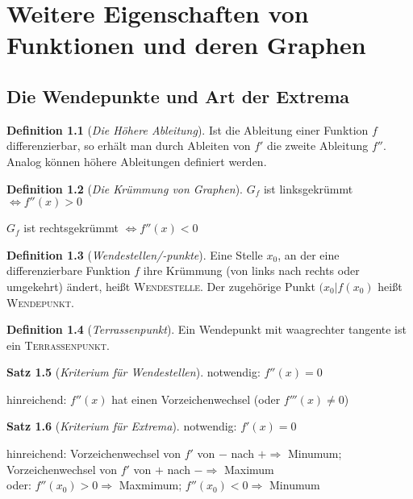 \documentclass[a4paper,12pt,pointlessnumbers]{scrreprt}
\theoremstyle{definition}
\newtheorem{definition}{Definition}[section]
\newtheorem{Satz}[definition]{Satz}
\begin{document}
\chapter{Weitere Eigenschaften von Funktionen und deren Graphen}



\section{Die Wendepunkte und Art der Extrema}
\begin{definition}[\emph{Die Höhere Ableitung}]
Ist die Ableitung einer Funktion $f$ differenzierbar, so erhält man durch Ableiten von $f'$ die zweite Ableitung $f''$. Analog können höhere Ableitungen definiert werden.
\end{definition}
\begin{definition}[\emph{Die Krümmung von Graphen}]
\item $G_f$ ist linksgekrümmt $\Leftrightarrow f''(x)>0$
\item $G_f$ ist rechtsgekrümmt $\Leftrightarrow f''(x)<0$
\end{definition}

\begin{definition}[\emph{Wendestellen/-punkte}]
Eine Stelle $x_0$, an der eine differenzierbare Funktion $f$ ihre Krümmung (von links nach rechts oder umgekehrt) ändert, heißt \textsc{Wendestelle}. Der zugehörige Punkt $(x_0|f(x_0)$ heißt \textsc{Wendepunkt}.
\end{definition}

\begin{definition}[\emph{Terrassenpunkt}]
Ein Wendepunkt mit waagrechter tangente ist ein \textsc{Terrassenpunkt}.
\end{definition}

\begin{Satz}[\emph{Kriterium für Wendestellen}]
\item notwendig: $f''(x)=0$
\item hinreichend: $f''(x)$ hat einen Vorzeichenwechsel (oder $f'''(x)\neq 0$)
\end{Satz}

\begin{Satz}[\emph{Kriterium für Extrema}]
\item notwendig: $f'(x)=0$
\item hinreichend: Vorzeichenwechsel von $f'$ von $-$ nach $+ \Rightarrow$ Minumum; Vorzeichenwechsel von $f'$ von $+$ nach $- \Rightarrow$ Maximum
\\ oder: $f''(x_0)>0 \Rightarrow$ Maxmimum; $f''(x_0)<0 \Rightarrow$ Minumum 

\end{Satz}
\end{document}
